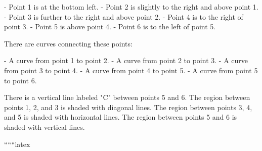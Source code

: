 - Point 1 is at the bottom left.
- Point 2 is slightly to the right and above point 1.
- Point 3 is further to the right and above point 2.
- Point 4 is to the right of point 3.
- Point 5 is above point 4.
- Point 6 is to the left of point 5.

There are curves connecting these points:

- A curve from point 1 to point 2.
- A curve from point 2 to point 3.
- A curve from point 3 to point 4.
- A curve from point 4 to point 5.
- A curve from point 5 to point 6.

There is a vertical line labeled "C" between points 5 and 6. The region between points 1, 2, and 3 is shaded with diagonal lines. The region between points 3, 4, and 5 is shaded with horizontal lines. The region between points 5 and 6 is shaded with vertical lines.

``````latex